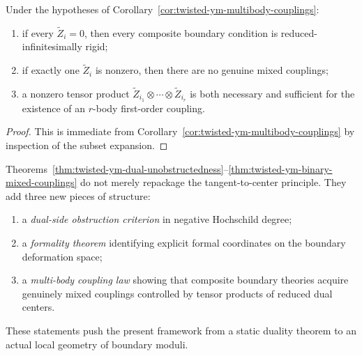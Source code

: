 \begin{corollary}
\label{cor:twisted-ym-mixed-rigidity}
Under the hypotheses of Corollary~\ref{cor:twisted-ym-multibody-couplings}:
\begin{enumerate}[label=(\roman*)]
\item if every $\widetilde Z_i=0$, then every composite boundary condition is reduced-infinitesimally rigid;
\item if exactly one $\widetilde Z_i$ is nonzero, then there are no genuine mixed couplings;
\item a nonzero tensor product $\widetilde Z_{i_1}\otimes\cdots\otimes\widetilde Z_{i_r}$ is both necessary and sufficient for the existence of an $r$-body first-order coupling.
\end{enumerate}
\end{corollary}

\begin{proof}
This is immediate from Corollary~\ref{cor:twisted-ym-multibody-couplings} by inspection of the subset expansion.
\end{proof}

\begin{remark}
\label{rem:twisted-ym-why-new}
Theorems~\ref{thm:twisted-ym-dual-unobstructedness}--\ref{thm:twisted-ym-binary-mixed-couplings} do not merely repackage the tangent-to-center principle.  They add three new pieces of structure:
\begin{enumerate}[label=(\roman*)]
\item a \emph{dual-side obstruction criterion} in negative Hochschild degree;
\item a \emph{formality theorem} identifying explicit formal coordinates on the boundary deformation space;
\item a \emph{multi-body coupling law} showing that composite boundary theories acquire genuinely mixed couplings controlled by tensor products of reduced dual centers.
\end{enumerate}
These statements push the present framework from a static duality theorem to an actual local geometry of boundary moduli.
\end{remark}



